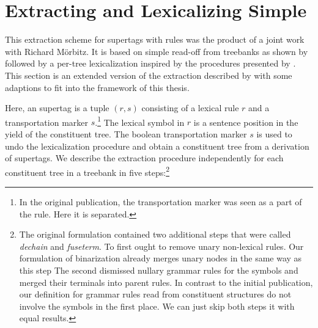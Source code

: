 \documentclass[../../document.tex]{subfiles}
\begin{document}
    \section{Extracting and Lexicalizing Simple } \label{sec:extraction:readoff}
    This extraction scheme for supertags with  rules was the product of a joint work with Richard Mörbitz. \citep{MoeRup20,RupMoe21}
    It is based on simple  read-off from treebanks as shown by \citet{KalMai13} followed by a per-tree lexicalization inspired by the procedures presented by \citet{EngMalMan18}.
    This section is an extended version of the extraction described by \citet{RupMoe21} with some adaptions to fit into the framework of this thesis.

    Here, an  supertag is a tuple \((r, s)\) consisting of a lexical rule \(r\) and a transportation marker \(s\).\footnote{
        In the original publication, the transportation marker was seen as a part of the  rule.
        Here it is separated.
    }
    The lexical symbol in \(r\) is a sentence position in the yield of the constituent tree.
    The boolean transportation marker \(s\) is used to undo the lexicalization procedure and obtain a constituent tree from a derivation of supertags.
    We describe the extraction procedure independently for each constituent tree in a treebank in five steps:\footnote{
        The original formulation contained two additional steps that were called \emph{dechain} and \emph{fuseterm}.
        To first ought to remove unary non-lexical rules.
        Our formulation of binarization already merges unary nodes in the same way as this step
        The second dismissed nullary grammar rules for the  symbols and merged their terminals into parent rules.
        In contrast to the initial publication, our definition for grammar rules read from constituent structures do not involve the  symbols in the first place.
        We can just skip both steps it with equal results.
    }
\end{document}
